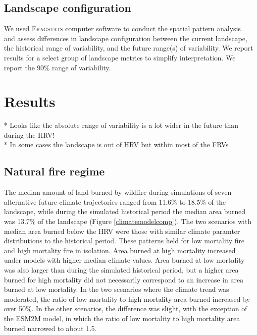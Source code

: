 \documentclass[12pt]{article}
\begin{document}
\begin{spacing}{1}
\subsection*{Landscape configuration}
We used \textsc{Fragstats} computer software \citep{McGarigal2012} to conduct the spatial pattern analysis and assess differences in landscape configuration between the current landscape, the historical range of variability, and the future range(s) of variability. We report results for a select group of landscape metrics to simplify interpretation. We report the 90\% range of variability. %

\section*{Results}
* Looks like the absolute range of variability is a lot wider in the future than during the HRV!  \\
* In some cases the landscape is out of HRV but within most of the FRVs

\subsection*{Natural fire regime}
The median amount of land burned by wildfire during simulations of seven alternative future climate trajectories ranged from 11.6\% to 18.5\% of the landscape, while during the simulated historical period the median area burned was 13.7\% of the landscape (Figure \ref{climatemodelcomp}). The two scenarios with median area burned below the HRV were those with similar climate paramter distributions to the historical period. These patterns held for low mortality fire and high mortality fire in isolation. Area burned at high mortality increased under models with higher median climate values. Area burned at low mortality was also larger than during the simulated historical period, but a higher area burned for high mortality did not necessarily correspond to an increase in area burned at low mortality. In the two scenarios where the climate trend was moderated, the ratio of low mortality to high mortality area burned increased by over 50\%. In the other scenarios, the difference was slight, with the exception of the ESM2M model, in which the ratio of low mortality to high mortality area burned narrowed to about 1.5. 


\end{spacing}
\end{document}
